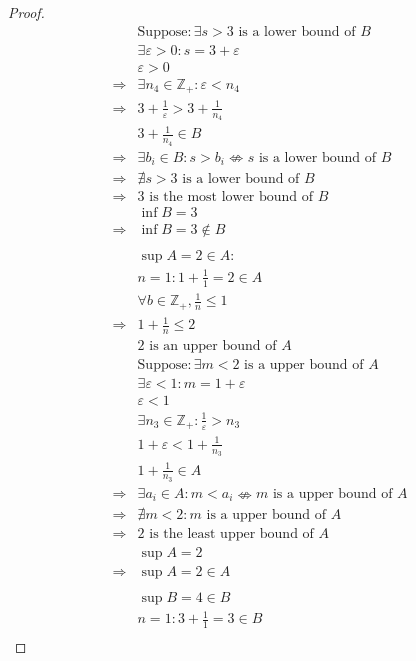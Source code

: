 \documentclass{article}
\begin{document}
\begin{proof}
\begin{align*}
        &\text{Suppose}:\exists s>3 \text{ is a lower bound of }B\\
        &\exists \varepsilon>0: s=3+\varepsilon\\
        &\varepsilon>0\\
        \Rightarrow&\exists n_4\in\mathbb{Z} _+:\varepsilon<n_4\\
        \Rightarrow&3+\frac{1}{\varepsilon}>3+\frac{1}{n_4}\\
        &3+\frac{1}{n_4}\in B\\
        \Rightarrow&\exists b_i\in B:s>b_i\nLeftrightarrow s \text{ is a lower bound of }B\\
        \Rightarrow&\nexists s>3\text{ is a lower bound of }B\\
        \Rightarrow&3\text{ is the most lower bound of }B\\
        &\inf B=3\\
        \Rightarrow&\inf B=3\notin B\\
        &\\
        & \sup A=2\in A:\\
        &n=1:1+\frac{1}{1}=2\in A\\
        &\forall b\in\mathbb{Z} _+,\frac{1}{n}\leqslant 1\\
        \Rightarrow&1+\frac{1}{n}\leqslant 2\\
        &2\text{ is an upper bound of }A\\
        &\text{Suppose}:\exists m<2\text{ is a upper bound of }A\\
        &\exists \varepsilon<1:m=1+\varepsilon\\
        &\varepsilon<1\\
        &\exists n_3\in\mathbb{Z} _+:\frac{1}{\varepsilon}>n_3\\
        &1+\varepsilon<1+\frac{1}{n_3}\\
        &1+\frac{1}{n_3}\in A\\
        \Rightarrow&\exists a_i\in A:m<a_i\nLeftrightarrow m\text{ is a upper bound of }A\\
        \Rightarrow&\nexists m<2:m\text{ is a upper bound of }A\\
        \Rightarrow&2\text{ is the least upper bound of }A\\
        &\sup A=2\\
        \Rightarrow&\sup A=2\in A\\
        &\\
        &\sup B=4\in B\\
        &n=1:3+\frac{1}{1}=3\in B\\

\end{align*}
\end{proof}
\end{document}

